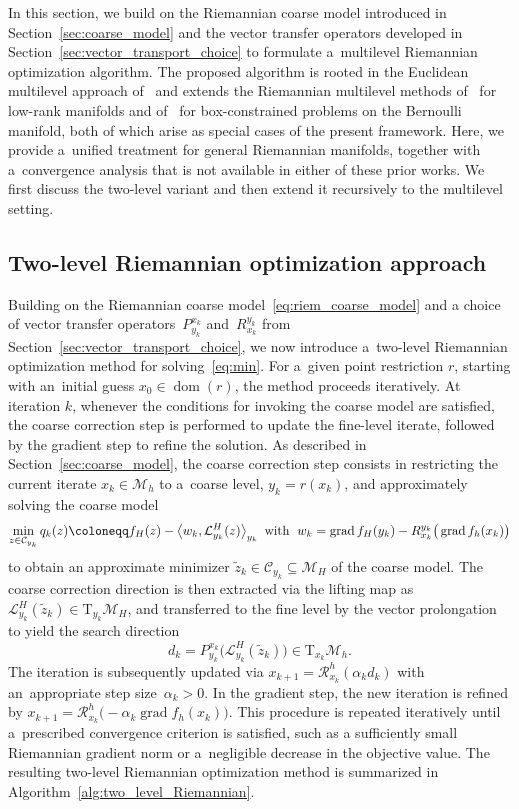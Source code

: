 \documentclass[11pt,reqno]{amsart}
\theoremstyle{plain}
\DeclareMathOperator{\grad}{grad}
\DeclareMathOperator{\dom}{dom}
\def\restr{r}
\newcommand\calC{\mathcal C}
\newcommand{\M}{\mathcal{M}}
\newcommand{\Tan}{\mathrm{T}}
\newcommand{\Ret}{\mathcal R}
\newcommand{\invRet}{\mathcal L}
\begin{document}
	In this section, we build on the Riemannian coarse model introduced in Section~\ref{sec:coarse_model} and the vector transfer operators developed in Section~\ref{sec:vector_transport_choice} to formulate a~multilevel Riemannian optimization algorithm. The proposed algorithm is rooted in the Euclidean multilevel approach of~\cite{Nash:2000,WenGoldfarb2010} and extends the Riemannian multilevel methods of~\cite{SutV2021} for low-rank manifolds and of~\cite{MuePZ23} for box-constrained problems on the Bernoulli manifold, both of which arise as special cases of the present framework. Here, we provide a~unified treatment for general Riemannian manifolds, together with a~convergence analysis that is not available in either of these prior works. We first discuss the two-level variant and then extend it recursively to the multilevel setting.
	
	\subsection{Two-level Riemannian optimization approach}
	\label{ssec:two-level}
	
	Building on the Riemannian coarse model~\eqref{eq:riem_coarse_model} and a
	choice of vector transfer operators~$P_{y_k}^{x_k}$ and~$R_{x_k}^{y_k}$ from Section~\ref{sec:vector_transport_choice}, we now introduce a~two-level Riemannian optimization method for solving~\eqref{eq:min}.
	For a~given point restriction $r$, starting with an~initial guess $x_0\in \dom(r)$, the method proceeds iteratively. At iteration $k$, whenever the conditions for invoking the coarse model are satisfied, the coarse correction step is performed to update the fine-level iterate, followed by the gradient step to refine the solution. As described in Section~\ref{sec:coarse_model}, the coarse correction step consists in restricting the current iterate $x_k\in \M_h$ to a~coarse level, $y_k=\restr(x_k)$, and approximately solving the coarse model
	\begin{equation} \label{eq:riem_coarse_model_k}
		\min \limits_{z \in \calC_{y_k}} q_k(z) \coloneqq f_H(z) - \big\langle w_k, \invRet^H_{y_k}(z)\big\rangle_{y_k} \enskip \text{with }\; w_k = \grad f_H(y_k) - R_{x_k}^{y_k}\big(\grad f_h(x_k)\big)
	\end{equation}
	to obtain an approximate minimizer $\tilde{z}_k \in \calC_{y_k}\subseteq\mathcal{M}_H$ of the 
	coarse model. The coarse correction direction is then extracted via the 
	lifting map as $\invRet_{y_k}^H(\tilde{z}_k) \in \Tan_{y_k}\mathcal{M}_H$, 
	and transferred to the fine level by the vector prolongation to yield the 
	search direction 
	\[
	d_k = P_{y_k}^{x_k}\bigl(\invRet_{y_k}^H(\tilde{z}_k)\bigr) \in \Tan_{x_k}\mathcal{M}_h.
	\]
	The iteration is subsequently updated via $x_{k+1} = \Ret_{x_k}^h(\alpha_kd_k)$ with an~appropriate step size~$\alpha_k>0$. In the gradient step, the new iteration is refined by $x_{k+1} = \Ret_{x_k}^h\big(\!-\alpha_k \grad f_h(x_k)\big)$. This procedure is repeated iteratively until a~prescribed convergence criterion is satisfied, such as a sufficiently small Riemannian gradient norm or a~negligible decrease in the objective value. The resulting two-level Riemannian optimization method is summarized in Algorithm~\ref{alg:two_level_Riemannian}.
	
\end{document}
